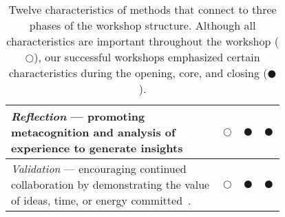 \begin{table}
\begin{tabular}{|m{0.7\linewidth}|m{0.03\linewidth}|m{0.03\linewidth}|m{0.03\linewidth}|}
        \hline
        \emph{Reflection} --- promoting metacognition and analysis of experience to generate insights~\cite{Boud1985} &  $\Circle$ & $\CIRCLE$ & $\CIRCLE$\\
        \hline
        \emph{Validation} --- encouraging continued collaboration by demonstrating the value of ideas, time, or energy committed~\cite{Hamilton2016}. & $\Circle$ & $\CIRCLE$ & $\CIRCLE$ \\
        \hline
    \end{tabular}
    \caption{Twelve characteristics of methods that connect to three phases of the workshop structure. Although all characteristics are important throughout the workshop ($\Circle$), our successful workshops emphasized certain characteristics during the opening, core, and closing ($\CIRCLE$).}
    \label{tab:method-characteristics}
\end{table}
